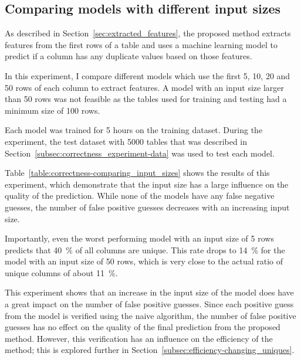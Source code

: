 \subsection{Comparing models with different input sizes}\label{subsec:correctness_comparing-input-size}
As described in Section~\ref{sec:extracted_features}, the proposed method extracts features from the first rows of a table and uses a machine learning model to predict if a column has any duplicate values based on those features.

In this experiment, I compare different models which use the first \num{5}, \num{10}, \num{20} and \num{50} rows of each column to extract features. A model with an input size larger than \num{50} rows was not feasible as the tables used for training and testing had a minimum size of \num{100} rows.


Each model was trained for \num{5} hours on the training dataset. During the experiment, the test dataset with \num{5000} tables that was described in Section~\ref{subsec:correctness_experiment-data} was used to test each model.

Table~\ref{table:correctness-comparing_input_sizes} shows the results of this experiment, which demonstrate that the input size has a large influence on the quality of the prediction. While none of the models have any false negative guesses, the number of false positive guesses decreases with an increasing input size.

Importantly, even the worst performing model with an input size of \num{5} rows predicts that \SI{40}{\percent} of all columns are unique. This rate drops %
to \SI{14}{\percent} for the model with an input size of \num{50} rows, which is very close to the actual ratio of unique columns of about \SI{11}{\percent}.

This experiment shows that an increase in the input size of the model does have a great impact on the number of false positive guesses. Since each positive guess from the model is verified using the naive algorithm, the number of false positive guesses has no effect on the quality of the final prediction from the proposed method. However, this verification has an influence on the efficiency of the method; this is explored further in Section~\ref{subsec:efficiency-changing_uniques}.

